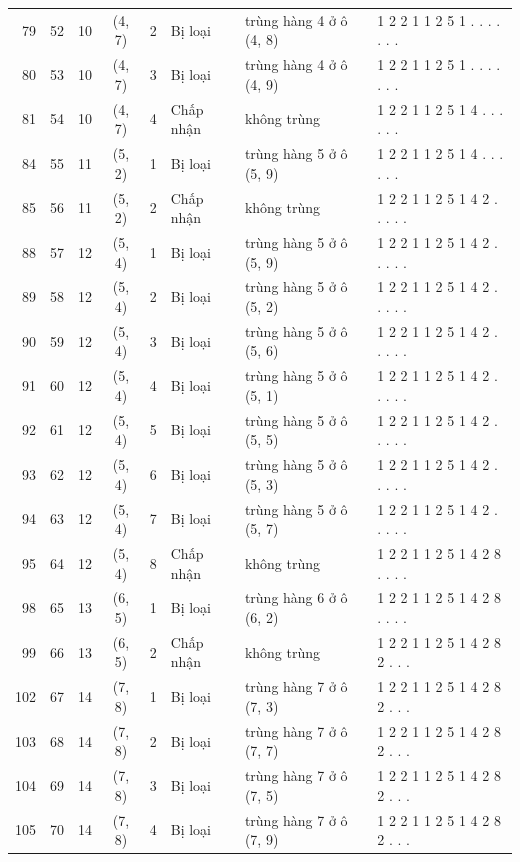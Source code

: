 \begin{longtable}{@{}rrrcc>{\raggedright\arraybackslash}p{2.1cm}>{\raggedright\arraybackslash}p{3.3cm}>{\ttfamily}l@{}}
79 & 52 & 10 & (4, 7) & 2 & Bị loại & trùng hàng 4 ở ô (4, 8) & 8 1 2 2 1 1 2 5 1 . . . . . . . \\
80 & 53 & 10 & (4, 7) & 3 & Bị loại & trùng hàng 4 ở ô (4, 9) & 8 1 2 2 1 1 2 5 1 . . . . . . . \\
81 & 54 & 10 & (4, 7) & 4 & Chấp nhận & không trùng & 8 1 2 2 1 1 2 5 1 4 . . . . . . \\
84 & 55 & 11 & (5, 2) & 1 & Bị loại & trùng hàng 5 ở ô (5, 9) & 8 1 2 2 1 1 2 5 1 4 . . . . . . \\
85 & 56 & 11 & (5, 2) & 2 & Chấp nhận & không trùng & 8 1 2 2 1 1 2 5 1 4 2 . . . . . \\
88 & 57 & 12 & (5, 4) & 1 & Bị loại & trùng hàng 5 ở ô (5, 9) & 8 1 2 2 1 1 2 5 1 4 2 . . . . . \\
89 & 58 & 12 & (5, 4) & 2 & Bị loại & trùng hàng 5 ở ô (5, 2) & 8 1 2 2 1 1 2 5 1 4 2 . . . . . \\
90 & 59 & 12 & (5, 4) & 3 & Bị loại & trùng hàng 5 ở ô (5, 6) & 8 1 2 2 1 1 2 5 1 4 2 . . . . . \\
91 & 60 & 12 & (5, 4) & 4 & Bị loại & trùng hàng 5 ở ô (5, 1) & 8 1 2 2 1 1 2 5 1 4 2 . . . . . \\
92 & 61 & 12 & (5, 4) & 5 & Bị loại & trùng hàng 5 ở ô (5, 5) & 8 1 2 2 1 1 2 5 1 4 2 . . . . . \\
93 & 62 & 12 & (5, 4) & 6 & Bị loại & trùng hàng 5 ở ô (5, 3) & 8 1 2 2 1 1 2 5 1 4 2 . . . . . \\
94 & 63 & 12 & (5, 4) & 7 & Bị loại & trùng hàng 5 ở ô (5, 7) & 8 1 2 2 1 1 2 5 1 4 2 . . . . . \\
95 & 64 & 12 & (5, 4) & 8 & Chấp nhận & không trùng & 8 1 2 2 1 1 2 5 1 4 2 8 . . . . \\
98 & 65 & 13 & (6, 5) & 1 & Bị loại & trùng hàng 6 ở ô (6, 2) & 8 1 2 2 1 1 2 5 1 4 2 8 . . . . \\
99 & 66 & 13 & (6, 5) & 2 & Chấp nhận & không trùng & 8 1 2 2 1 1 2 5 1 4 2 8 2 . . . \\
102 & 67 & 14 & (7, 8) & 1 & Bị loại & trùng hàng 7 ở ô (7, 3) & 8 1 2 2 1 1 2 5 1 4 2 8 2 . . . \\
103 & 68 & 14 & (7, 8) & 2 & Bị loại & trùng hàng 7 ở ô (7, 7) & 8 1 2 2 1 1 2 5 1 4 2 8 2 . . . \\
104 & 69 & 14 & (7, 8) & 3 & Bị loại & trùng hàng 7 ở ô (7, 5) & 8 1 2 2 1 1 2 5 1 4 2 8 2 . . . \\
105 & 70 & 14 & (7, 8) & 4 & Bị loại & trùng hàng 7 ở ô (7, 9) & 8 1 2 2 1 1 2 5 1 4 2 8 2 . . . \\

\end{longtable}
